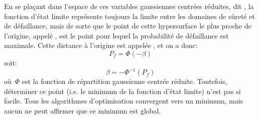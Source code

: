\medskip
En se plaçant dans l'espace de ces variables gaussiennes centrées réduites, dit , la fonction d'état limite représente toujours la limite entre les domaines de sûreté et de défaillance, mais de sorte que le point de cette hypersurface le plus proche de l'origine, appelé , est le point pour lequel la probabilité de défaillance est maximale.
Cette distance à l'origine est appelée , et on a donc:
\begin{equation}\label{Eq-StoPf}
P_f = \Phi(-\beta)
\end{equation}
soit:
\begin{equation}
\beta = -\Phi^{-1}(P_f)
\end{equation}
où~$\Phi$ est la fonction de répartition gaussienne centrée réduite.
Toutefois, déterminer ce point (i.e. le minimum de la fonction d'état limite) n'est pas si facile. Tous les algorithmes d'optimisation convergent vers un minimum, mais aucun ne peut affirmer que ce minimum est global.

